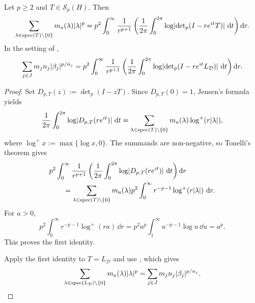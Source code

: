 \begin{corollary}
  \label{cor:schatten-mass}
  Let \(p\ge 2\) and \(T\in \mathcal S_p(H)\). Then
  \[
    \sum_{\lambda\in\operatorname{spec}(T)\setminus\{0\}}m_a(\lambda)\lvert \lambda \rvert^p
    =p^2\int_0^\infty \frac{1}{r^{p+1}}
      \left(
        \frac{1}{2\pi}\int_0^{2\pi}
          \log\lvert \det\nolimits_p(I-re^{it}T) \rvert\,\mathop{}\!\mathrm{d} t
      \right)\mathop{}\!\mathrm{d} r.
  \]
  In the setting of ,
  \[
    \sum_{j\in J}m_jn_j\lvert \beta_j \rvert^{p/n_j}
    =p^2\int_0^\infty \frac{1}{r^{p+1}}
      \left(
        \frac{1}{2\pi}\int_0^{2\pi}
          \log\lvert \det\nolimits_p(I-re^{it}L_{\mathcal D}) \rvert\,\mathop{}\!\mathrm{d} t
      \right)\mathop{}\!\mathrm{d} r.
  \]
\end{corollary}

\begin{proof}
  Set \(D_{p,T}(z):=\det_p(I-zT)\). Since \(D_{p,T}(0)=1\), Jensen's
  formula yields
  \[
    \frac{1}{2\pi}\int_0^{2\pi}\log\lvert D_{p,T}(re^{it}) \rvert\,\mathop{}\!\mathrm{d} t
    =\sum_{\lambda\in\operatorname{spec}(T)\setminus\{0\}}
      m_a(\lambda)\log^+(r\lvert \lambda \rvert),
  \]
  where \(\log^+x:=\max\{\log x,0\}\). The summands are non-negative, so
  Tonelli's theorem gives
  \begin{align*}
    &p^2\int_0^\infty \frac{1}{r^{p+1}}
      \left(
        \frac{1}{2\pi}\int_0^{2\pi}
          \log\lvert D_{p,T}(re^{it}) \rvert\,\mathop{}\!\mathrm{d} t
      \right)\mathop{}\!\mathrm{d} r \\
    &\qquad
      =\sum_{\lambda\in\operatorname{spec}(T)\setminus\{0\}}m_a(\lambda)
        p^2\int_0^\infty r^{-p-1}\log^+(r\lvert \lambda \rvert)\,\mathop{}\!\mathrm{d} r.
  \end{align*}
  For \(a>0\),
  \[
    p^2\int_0^\infty r^{-p-1}\log^+(ra)\,\dd r
    =p^2a^p\int_1^\infty u^{-p-1}\log u\,\dd u
    =a^p.
  \]
  This proves the first identity.

  Apply the first identity to \(T=L_{\mathcal D}\) and use
  , which gives
  \[
    \sum_{\lambda\in\operatorname{spec}(L_{\mathcal D})\setminus\{0\}}
      m_a(\lambda)\lvert \lambda \rvert^p
    =\sum_{j\in J}m_jn_j\lvert \beta_j \rvert^{p/n_j}.
  \]
\end{proof}

